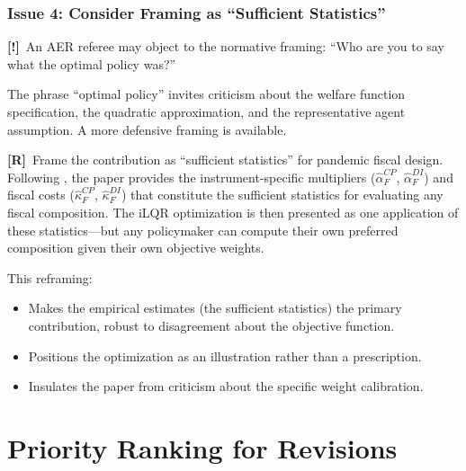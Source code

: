 \documentclass[12pt, a4paper]{article}
\newcommand{\concern}[1]{\textcolor{concern}{\textbf{[!]}~#1}}
\newcommand{\recommend}[1]{\textcolor{recommend}{\textbf{[R]}~#1}}
\begin{document}
\subsubsection*{Issue 4: Consider Framing as ``Sufficient Statistics''}

\concern{An AER referee may object to the normative framing: ``Who are you to say what the optimal policy was?''}

The phrase ``optimal policy'' invites criticism about the welfare function specification, the quadratic approximation, and the representative agent assumption. A more defensive framing is available.

\recommend{Frame the contribution as ``sufficient statistics'' for pandemic fiscal design.} Following \citet{chetty2009}, the paper provides the instrument-specific multipliers ($\hat{\alpha}_F^{CP}$, $\hat{\alpha}_F^{DI}$) and fiscal costs ($\hat{\kappa}_F^{CP}$, $\hat{\kappa}_F^{DI}$) that constitute the sufficient statistics for evaluating any fiscal composition. The iLQR optimization is then presented as one application of these statistics---but any policymaker can compute their own preferred composition given their own objective weights.

This reframing:
\begin{itemize}
    \item Makes the empirical estimates (the sufficient statistics) the primary contribution, robust to disagreement about the objective function.
    \item Positions the optimization as an illustration rather than a prescription.
    \item Insulates the paper from criticism about the specific weight calibration.
\end{itemize}


\section{Priority Ranking for Revisions}
\end{document}
